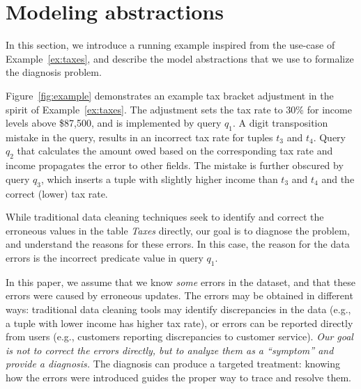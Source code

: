 
\section{Modeling abstractions}
\label{sec:abstractions}

In this section, we introduce a running example inspired from the use-case of
Example~\ref{ex:taxes}, and describe the model abstractions that we use to
formalize the diagnosis problem.





\begin{example}\label{ex:taxes2}
    
Figure~\ref{fig:example} demonstrates an example tax bracket adjustment in the
spirit of Example~\ref{ex:taxes}. The adjustment sets the tax rate to 30\% for
income levels above \$87,500, and is implemented by query $q_1$. A digit
transposition mistake in the query, results in an incorrect tax rate for tuples
$t_3$ and $t_4$. Query $q_2$ that calculates the amount owed based on the corresponding
tax rate and income propagates the error to other fields. The mistake is
further obscured by query $q_3$, which inserts a tuple with slightly higher
income than $t_3$ and $t_4$ and the correct (lower) tax rate.

\end{example}
% 
While traditional data cleaning techniques seek to identify and correct the
erroneous values in the table \emph{Taxes} directly, our goal is to diagnose
the problem, and understand the reasons for these errors. In this case, the
reason for the data errors is the incorrect predicate value in query $q_1$.

In this paper, we assume that we know \emph{some} errors in the dataset, and
that these errors were caused by erroneous updates. The errors may be
obtained in different ways: traditional data cleaning tools may identify
discrepancies in the data (e.g., a tuple with lower income has higher tax
rate), or errors can be reported directly from users (e.g., customers
reporting discrepancies to customer service). \emph{Our goal is not to correct
the errors directly, but to analyze them as a ``symptom'' and provide a
diagnosis.} The diagnosis can produce a targeted treatment: knowing how the
errors were introduced guides the proper way to trace and resolve them.





